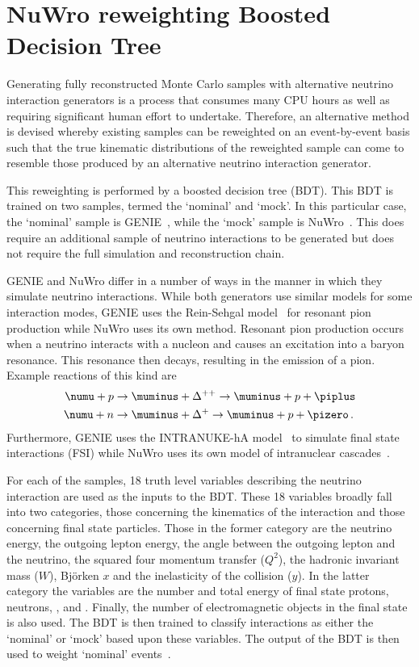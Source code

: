 \section{NuWro reweighting Boosted Decision Tree}
\label{sec:dune_ndrwt:bdt}

Generating fully reconstructed Monte Carlo samples with alternative neutrino interaction generators is a process that consumes many CPU hours as well as requiring significant human effort to undertake.
Therefore, an alternative method is devised whereby existing samples can be reweighted on an event-by-event basis such that the true kinematic distributions of the reweighted sample can come to resemble those produced by an alternative neutrino interaction generator.

This reweighting is performed by a boosted decision tree (BDT).
This BDT is trained on two samples, termed the `nominal' and `mock'.
In this particular case, the `nominal' sample is GENIE~\cite{genie}, while the `mock' sample is NuWro~\cite{nuwro}.
This does require an additional sample of neutrino interactions to be generated but does not require the full simulation and reconstruction chain.

GENIE and NuWro differ in a number of ways in the manner in which they simulate neutrino interactions.
While both generators use similar models for some interaction modes, GENIE uses the Rein-Sehgal model~\cite{reinSehgal} for resonant pion production while NuWro uses its own method.
Resonant pion production occurs when a neutrino interacts with a nucleon and causes an excitation into a baryon resonance. 
This resonance then decays, resulting in the emission of a pion.
Example reactions of this kind are 
\begin{align}
	\numu + p &\rightarrow \muminus + \Delta^{++} \rightarrow \muminus + p + \piplus \\
	\numu + n &\rightarrow \muminus + \Delta^{+} \rightarrow \muminus + p + \pizero \, . 
\end{align}
Furthermore, GENIE uses the INTRANUKE-hA model~\cite{intranuke} to simulate final state interactions (FSI) while NuWro uses its own model of intranuclear cascades~\cite{nuwroCascade}.

For each of the samples, 18 truth level variables describing the neutrino interaction are used as the inputs to the BDT.
These 18 variables broadly fall into two categories, those concerning the kinematics of the interaction and those concerning final state particles. Those in the former category are the neutrino energy, the outgoing lepton energy, the angle between the outgoing lepton and the neutrino, the squared four momentum transfer ($Q^{2}$), the hadronic invariant mass ($W$), Bj\"orken $x$ and the inelasticity of the collision ($y$).
In the latter category the variables are the number and total energy of final state protons, neutrons, \piplus, \piminus and \pizero. 
Finally, the number of electromagnetic objects in the final state is also used.
The BDT is then trained to classify interactions as either the `nominal' or `mock' based upon these variables.
The output of the BDT is then used to weight `nominal' events~\cite{vilelaBDT}.


